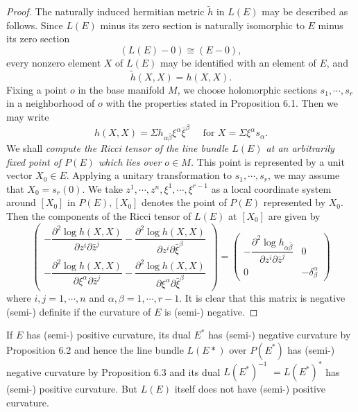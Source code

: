 \documentclass[lang=en,12pt]{beautybook}
\begin{document}
\begin{proof}
  The naturally induced hermitian metric $\tilde{h}$ in $L(E)$ may be described as follows. Since $L(E)$ minus its zero section is naturally isomorphic to $E$ minus its zero section
  \[(L(E)-0)\cong (E-0),\]
  every nonzero element $X$ of $L(E)$ may be identified with an element of $E$, and
  \begin{equation*}
    \tilde{h}(X, X)=h(X, X) .
  \end{equation*}
  Fixing a point $o$ in the base manifold $M$, we choose holomorphic sections $s_1, \cdots, s_r$ in a neighborhood of $o$ with the properties stated in Proposition 6.1. Then we may write
  \begin{equation*}
    h(X, X)=\Sigma h_{\alpha \bar{\beta}} \xi^\alpha \bar{\xi}^\beta \quad \text { for } X=\Sigma \xi^\alpha s_\alpha .
  \end{equation*}
  We shall \textit{compute the Ricci tensor of the line bundle $L(E)$ at an arbitrarily fixed point of $P(E)$ which lies over $o \in M$.} This point is represented by a unit vector $X_0 \in E$. Applying a unitary transformation to $s_1, \cdots, s_r$, we may assume that $X_0=s_r(0)$. We take $z^1, \cdots, z^n, \xi^1, \cdots, \xi^{r-1}$ as a local coordinate system around $\left[X_0\right]$ in $P(E),\left[X_0\right]$ denotes the point of $P(E)$ represented by $X_0$. Then the components of the Ricci tensor of $L(E)$ at $\left[X_0\right]$ are given by
  \begin{equation*}
    \left(\begin{array}{l}
      -\dfrac{\partial^2 \log h(X, X)}{\partial z^i \partial \bar{z}^j}-\dfrac{\partial^2 \log h(X, X)}{\partial z^i \partial \bar{\xi}^\beta} \\[1mm]
      -\dfrac{\partial^2 \log h(X, X)}{\partial \xi^\alpha \partial \bar{z}^j}-\dfrac{\partial^2 \log h(X, X)}{\partial \xi^\alpha \partial \bar{\xi}^\beta}
    \end{array}\right)=\left(\begin{array}{cr}
      -\dfrac{\partial^2 \log h_{\alpha \bar{\beta}}}{\partial z^i \partial \bar{z}^j} & 0                    \\[1mm]
      0                                                                                & -\delta_\beta^\alpha
    \end{array}\right)
  \end{equation*}
  where $i, j=1, \cdots, n$ and $\alpha, \beta=1, \cdots, r-1$. It is clear that this matrix is negative (semi-) definite if the curvature of $E$ is (semi-) negative.
\end{proof}
\begin{remark}
  If $E$ has (semi-) positive curvature, its dual $E^*$ has (semi-) negative curvature by Proposition 6.2 and hence the line bundle $L(E *)$ over $P\left(E^*\right)$ has (semi-) negative curvature by Proposition 6.3 and its dual $L\left(E^*\right)^{-1}$ $=L\left(E^*\right)^*$ has (semi-) positive curvature. But $L(E)$ itself does not have (semi-) positive curvature.
\end{remark}
\end{document}
